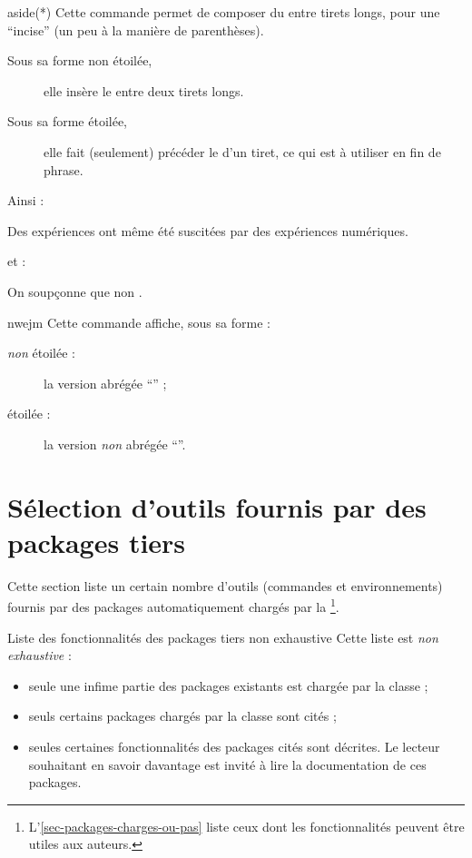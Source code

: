 \documentclass[french,nolocaltoc]{nwejmart}
\newtheorem[style=definition]{fait}
\newtheorem[title=contraventionnalisation]{ctrv}
\newtheorem[title-plural=anneaux]{anneau}
\newtheorem[title-plural=idéaux]{idéal}
\begin{document}
\begin{docCommand}{aside(*)}{}
  Cette commande permet de composer du  entre tirets longs, pour une
  \enquote{incise} (un peu à la manière de parenthèses).
  \begin{description}
  \item[Sous sa forme non étoilée,] elle insère le  entre deux
    tirets longs.
  \item[Sous sa forme étoilée,] elle fait (seulement) précéder le 
    d'un tiret, ce qui est à utiliser en fin de phrase.
  \end{description}
  Ainsi :
\begin{bodycode}
Des expériences  ont même été
suscitées par des expériences numériques.
\end{bodycode}
  et :
\begin{bodycode}[listing and text,listing options={deletekeywords={exemple}}]
On soupçonne que non .
\end{bodycode}
\end{docCommand}

\begin{docCommand}{nwejm}{}
  Cette commande affiche, sous sa forme :
  \begin{description}
  \item[\emph{non} étoilée :] la version abrégée \enquote{\nwejm{}} ;
  \item[étoilée :] la version \emph{non} abrégée \enquote{\nwejm*{}}.
  \end{description}
\end{docCommand}

\section{Sélection d'outils fournis par des packages tiers}

Cette section liste un certain nombre d'outils (commandes et environnements)
fournis par des packages automatiquement chargés par la
\nwejmauthorcl\footnote{L'\vref{sec-packages-charges-ou-pas} liste ceux dont les
  fonctionnalités peuvent être utiles aux auteurs.}.

\begin{dbwarning}{Liste des fonctionnalités des packages tiers non exhaustive}{}
  Cette liste est \emph{non exhaustive} :
  \begin{itemize}
  \item seule une infime partie des packages existants est chargée par la
    classe ;
  \item seuls certains packages chargés par la classe sont cités ;
  \item seules certaines fonctionnalités des packages cités sont décrites. Le
    lecteur souhaitant en savoir davantage est invité à lire la documentation de
    ces packages.
  \end{itemize}
\end{dbwarning}
\end{document}
